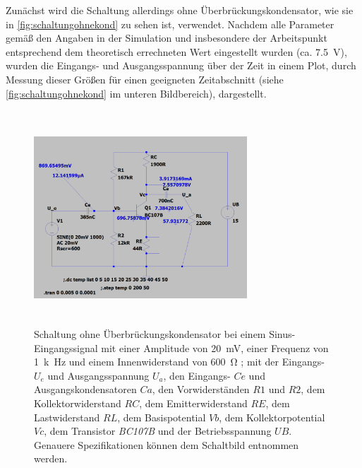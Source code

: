 \documentclass[12pt,english,ngerman]{scrartcl}
\begin{document}
Zunächst wird die Schaltung allerdings ohne Überbrückungskondensator, wie sie
in  \autoref{fig:schaltungohnekond} zu sehen ist, verwendet. Nachdem
alle Parameter gemäß den Angaben in der Simulation und insbesondere der
Arbeitspunkt entsprechend dem theoretisch errechneten Wert eingestellt wurden
(ca. \SI{7.5}{\volt}), wurden die Eingangs- und Ausgangsspannung über der Zeit in
einem Plot, durch Messung dieser Größen für einen geeigneten Zeitabschnitt
(siehe  \autoref{fig:schaltungohnekond} im unteren Bildbereich),
dargestellt. 

\begin{figure}[H]
    \centering
    \includegraphics[width=8cm, height=8cm,keepaspectratio]{./figures/ohnekond/schaltungmitmessungen20mv.png}
    \caption{Schaltung ohne Überbrückungskondensator bei einem Sinus-Eingangssignal
    mit einer Amplitude von \SI{20}{mV}, einer Frequenz von \SI{1}{k\hertz} und einem
    Innenwiderstand von \SI{600}{\ohm} ; mit der Eingangs- $U_e$ und
    Ausgangsspannung $U_a$, den Eingangs- $Ce$ und Ausgangskondensatoren $Ca$, den
    Vorwiderständen $R1$ und $R2$, dem Kollektorwiderstand $RC$, dem
    Emitterwiderstand $RE$, dem Lastwiderstand $RL$, dem Basispotential $Vb$, dem
    Kollektorpotential $Vc$, dem Transistor \textit{BC107B} und der
    Betriebsspannung $UB$. Genauere Spezifikationen können dem Schaltbild entnommen
    werden.}
    \label{fig:schaltungohnekond}
\end{figure}

\end{document}
